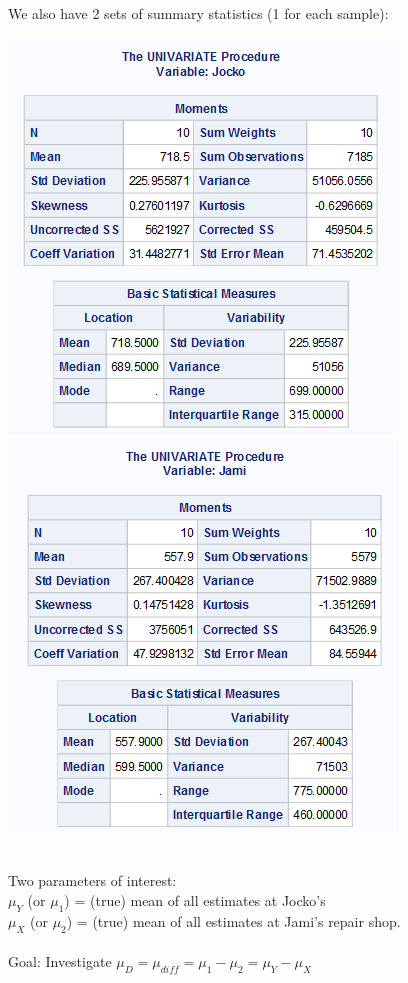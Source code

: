 We also have 2 sets of summary statistics (1 for each sample):
\begin{center}
\includegraphics[scale=0.8]{summarycars1}\includegraphics[scale=0.8]{summarycars2}
\end{center}
~\\
Two parameters of interest:\\
$\mu_Y$ (or $\mu_{1}$) = (true) mean of all estimates at Jocko's\\
$\mu_X$ (or $\mu_{2}$) = (true) mean of all estimates at Jami's repair shop.\\~\\
Goal:  Investigate $\mu_{D}=\mu_{diff}=\mu_1-\mu_2=\mu_Y-\mu_X$\\~\\

